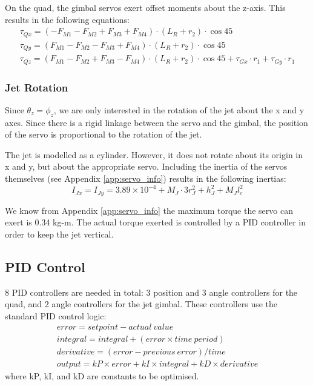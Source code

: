 \documentclass[10pt]{article}
\begin{document}
On the quad, the gimbal servos exert offset moments about the z-axis. This results in the following equations:
\begin{eqnarray}
    \tau_{Qx} = (-F_{M1} - F_{M2} + F_{M3} + F_{M4})\cdot(L_R + r_2)\cdot \cos{45} \\
    \tau_{Qy} = (F_{M1} - F_{M2} - F_{M3} + F_{M4})\cdot(L_R + r_2)\cdot \cos{45} \\
    \tau_{Qz} = (F_{M1} - F_{M2} + F_{M3} - F_{M4})\cdot(L_R + r_2)\cdot \cos{45} + \tau_{Gx}\cdot r_1 + \tau_{Gy}\cdot r_1
\end{eqnarray}

\subsubsection{Jet Rotation}
Since $\theta_z = \phi_z$, we are only interested in the rotation of the jet about the x and y axes. Since there is a rigid linkage between the servo and the gimbal, the position of the servo is proportional to the rotation of the jet.

The jet is modelled as a cylinder. However, it does not rotate about its origin in x and y, but about the appropriate servo. Including the inertia of the servos themselves (see Appendix \ref{app:servo_info}) results in the following inertias:
\begin{equation}
    I_{Jx} = I_{Jy} = 3.89\times10^{-4} + M_J\cdot3r_J^2 + h_J^2 + M_Jl_c^2
\end{equation}

We know from Appendix \ref{app:servo_info} the maximum torque the servo can exert is 0.34 kg-m. The actual torque exerted is controlled by a PID controller in order to keep the jet vertical.

\subsection{PID Control}
8 PID controllers are needed in total: 3 position and 3 angle controllers for the quad, and 2 angle controllers for the jet gimbal. These controllers use the standard PID control logic:
\begin{eqnarray*}
    error = setpoint - actual\ value \\
    integral = integral + (error \times time\ period) \\
    derivative = (error - previous\ error)/time \\
    output = kP \times error + kI \times integral + kD \times derivative
\end{eqnarray*}
where kP, kI, and kD are constants to be optimised.
\end{document}
